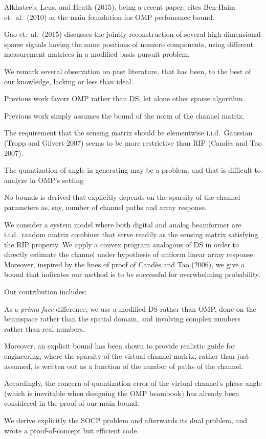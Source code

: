 Alkhateeb, Leus, and Heath (2015), being a recent paper, cites Ben-Haim et.\ al.\ (2010) as the main foundation for OMP perfomance bound.

Gao et.\ al.\ (2015) discusses the jointly reconstruction of several high-dimensional sparse signals having the same positions of nonzero components, using different measurement matrices in a modified basis pursuit problem.

We remark several observation on past literature, that has been, to the best of our knowledge, lacking or less than ideal.

\startitemize
\item Previous work favors OMP rather than DS, let alone other sparse algorithm.
\item Previous work simply assumes the bound of the norm of the channel matrix.
\item The requirement that the sensing matrix should be elementwise i.i.d.\ Gaussian (Tropp and Gilvert 2007) seems to be more restrictive than RIP (Cand\`es and Tao 2007).
\item The quantization of angle in generating may be a problem, and that is difficult to analyze in OMP's setting
\item No bounds is derived that explicitly depends on the sparsity of the channel parameters as, say, number of channel paths and array response.
\stopitemize

\startsection [title={Our Contribution}]

We consider a system model where both digital and analog beamformer are i.i.d.\ random matrix combiner that serve readily as the sensing matrix satisfying the RIP property.
We apply a convex program analogous of DS in order to directly estimate the channel under hypothesis of uniform linear array response.
Moreover, inspired by the lines of proof of Cand\`es and Tao (2006), we give a bound that indicates our method is to be successful for overwhelming probability.

Our contribution includes:

\startitemize
\item As a {\it prima face} difference, we use a modified DS rather than OMP, done on the beamspace rather than the spatial domain, and involving complex numbers rather than real numbers.
\item Moreover, an explicit bound has been shown to provide realistic guide for engineering, where the sparsity of the virtual channel matrix, rather than just assumed, is written out as a function of the number of paths of the channel.
\item Accordingly, the concern of quantization error of the virtual channel's phase angle (which is inevitable when designing the OMP beambook) has already been considered in the proof of our main bound.
\item We derive explicitly the SOCP problem and afterwards its dual problem, and wrote a proof-of-concept but efficient code.
\stopitemize

\stopsection

\stopchapter

